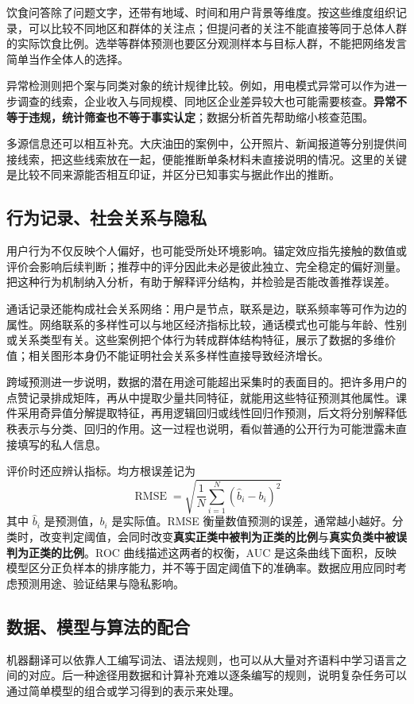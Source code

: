 \documentclass[UTF8,fontset=fandol,a4paper,12pt]{ctexart}
\theoremstyle{definition}
\begin{document}
饮食问答除了问题文字，还带有地域、时间和用户背景等维度。按这些维度组织记录，可以比较不同地区和群体的关注点；但提问者的关注不能直接等同于总体人群的实际饮食比例。选举等群体预测也要区分观测样本与目标人群，不能把网络发言简单当作全体人的选择。

异常检测则把个案与同类对象的统计规律比较。例如，用电模式异常可以作为进一步调查的线索，企业收入与同规模、同地区企业差异较大也可能需要核查。\textbf{异常不等于违规，统计筛查也不等于事实认定}；数据分析首先帮助缩小核查范围。

多源信息还可以相互补充。大庆油田的案例中，公开照片、新闻报道等分别提供间接线索，把这些线索放在一起，便能推断单条材料未直接说明的情况。这里的关键是比较不同来源能否相互印证，并区分已知事实与据此作出的推断。

\subsection{行为记录、社会关系与隐私}
用户行为不仅反映个人偏好，也可能受所处环境影响。锚定效应指先接触的数值或评价会影响后续判断；推荐中的评分因此未必是彼此独立、完全稳定的偏好测量。把这种行为机制纳入分析，有助于解释评分结构，并检验是否能改善推荐误差。

通话记录还能构成社会关系网络：用户是节点，联系是边，联系频率等可作为边的属性。网络联系的多样性可以与地区经济指标比较，通话模式也可能与年龄、性别或关系类型有关。这些案例把个体行为转成群体结构特征，展示了数据的多维价值；相关图形本身仍不能证明社会关系多样性直接导致经济增长。

跨域预测进一步说明，数据的潜在用途可能超出采集时的表面目的。把许多用户的点赞记录排成矩阵，再从中提取少量共同特征，就能用这些特征预测其他属性。课件采用奇异值分解提取特征，再用逻辑回归或线性回归作预测，后文将分别解释低秩表示与分类、回归的作用。这一过程也说明，看似普通的公开行为可能泄露未直接填写的私人信息。

评价时还应辨认指标。均方根误差记为
\[
 \operatorname{RMSE}=\sqrt{\frac1N\sum_{i=1}^N(\widehat b_i-b_i)^2}
\]
其中 $\widehat b_i$ 是预测值，$b_i$ 是实际值。RMSE 衡量数值预测的误差，通常越小越好。分类时，改变判定阈值，会同时改变\textbf{真实正类中被判为正类的比例}与\textbf{真实负类中被误判为正类的比例}。ROC 曲线描述这两者的权衡，AUC 是这条曲线下面积，反映模型区分正负样本的排序能力，并不等于固定阈值下的准确率。数据应用应同时考虑预测用途、验证结果与隐私影响。

\subsection{数据、模型与算法的配合}
机器翻译可以依靠人工编写词法、语法规则，也可以从大量对齐语料中学习语言之间的对应。后一种途径用数据和计算补充难以逐条编写的规则，说明复杂任务可以通过简单模型的组合或学习得到的表示来处理。
\end{document}
